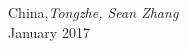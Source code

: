% 
% 
\preface



\vspace{1cm}
\begin{flushleft}\noindent
China,\hfill {\it Tongzhe, Sean Zhang}\\
January 2017 \\
\end{flushleft}